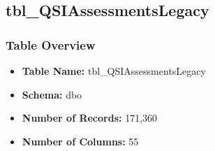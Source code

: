 \begin{landscape}
\subsection{tbl\_QSIAssessmentsLegacy}

\subsubsection{Table Overview}
\begin{itemize}
\item \textbf{Table Name:} tbl\_QSIAssessmentsLegacy
\item \textbf{Schema:} dbo
\item \textbf{Number of Records:} 171,360
\item \textbf{Number of Columns:} 55
\end{itemize}


\end{landscape}
